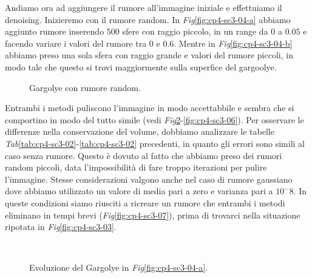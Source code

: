 Andiamo ora ad aggiungere il rumore all'immagine iniziale e
effettuiamo il denoising. Inizieremo con il rumore random. In
\emph{Fig}\ref{fig:cp4-sc3-04-a} abbiamo aggiunto rumore inserendo
$500$ sfere con raggio piccolo, in un range da $0$ a $0.05$ e facendo
variare i valori del rumore tra $0$ e $0.6$. Mentre in
\emph{Fig}\ref{fig:cp4-sc3-04-b} abbiamo preso una sola sfera con
raggio grande e valori del rumore piccoli, in modo tale che questo si trovi maggiormente sulla superfice del gargoolye. 

\begin{figure}[h!tb]
  \centering
  \quad
  \quad
  \caption{Gargolye con rumore random.}
  \label{fig:cp4-sc3-04}
\end{figure}

Entrambi i metodi puliscono l'immagine in modo accettabbile e sembra
che si comportino in modo del tutto simile (vedi
\emph{Fig}\ref{fig:cp4-sc3-05}-\ref{fig:cp4-sc3-06}). Per osservare le
differenze nella conservazione del volume, dobbiamo analizzare le tabelle
\emph{Tab}\ref{tab:cp4-sc3-02}-\ref{tab:cp4-sc3-02} precedenti, in
quanto gli errori sono simili al caso senza rumore. Questo è dovuto al
fatto che abbiamo preso dei rumori random piccoli, data
l'impossibilità di fare troppo iterazioni per pulire
l'immagine. Stesse considerazioni valgono anche nel caso di rumore
gaussiano dove abbiamo utilizzato un valore di media pari a zero e
varianza pari a $10^-8$. In queste condizioni siamo riusciti a
ricreare un rumore che entrambi i metodi eliminano in tempi brevi
(\emph{Fig}\ref{fig:cp4-sc3-07}), prima di trovarci nella situazione ripotata in
\emph{Fig}\ref{fig:cp4-sc3-03}. 

\begin{figure}[h!tb]
  \centering
  \quad
  \\
  \quad
  \caption{Evoluzione del Gargolye in \emph{Fig}\ref{fig:cp4-sc3-04-a}.}
  \label{fig:cp4-sc3-05}
\end{figure} 

